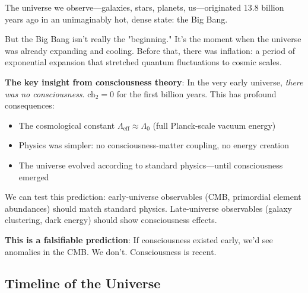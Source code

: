 \begin{intuitive}
The universe we observe—galaxies, stars, planets, us—originated 13.8 billion years ago in an unimaginably hot, dense state: the Big Bang.

But the Big Bang isn't really the "beginning." It's the moment when the universe was already expanding and cooling. Before that, there was inflation: a period of exponential expansion that stretched quantum fluctuations to cosmic scales.

\textbf{The key insight from consciousness theory}: In the very early universe, \textit{there was no consciousness}. ch$_2 = 0$ for the first billion years. This has profound consequences:
\begin{itemize}
\item The cosmological constant $\Lambda_{\text{eff}} \approx \Lambda_0$ (full Planck-scale vacuum energy)
\item Physics was simpler: no consciousness-matter coupling, no energy creation
\item The universe evolved according to standard physics—until consciousness emerged
\end{itemize}

We can test this prediction: early-universe observables (CMB, primordial element abundances) should match standard physics. Late-universe observables (galaxy clustering, dark energy) should show consciousness effects.

\textbf{This is a falsifiable prediction}: If consciousness existed early, we'd see anomalies in the CMB. We don't. Consciousness is recent.
\end{intuitive}

\subsection{Timeline of the Universe}

